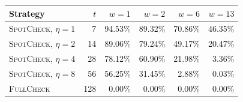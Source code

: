 \begin{tabular}{lrrrrr}
\toprule
Strategy & $t$ & $w{=}1$ & $w{=}2$ & $w{=}6$ & $w{=}13$ \\
\midrule
\textsc{SpotCheck}, $\eta{=}1$ & 7 & 94.53\% & 89.32\% & 70.86\% & 46.35\% \\
\textsc{SpotCheck}, $\eta{=}2$ & 14 & 89.06\% & 79.24\% & 49.17\% & 20.47\% \\
\textsc{SpotCheck}, $\eta{=}4$ & 28 & 78.12\% & 60.90\% & 21.98\% & 3.36\% \\
\textsc{SpotCheck}, $\eta{=}8$ & 56 & 56.25\% & 31.45\% & 2.88\% & 0.03\% \\
\textsc{FullCheck} & 128 & 0.00\% & 0.00\% & 0.00\% & 0.00\% \\
\bottomrule
\end{tabular}
